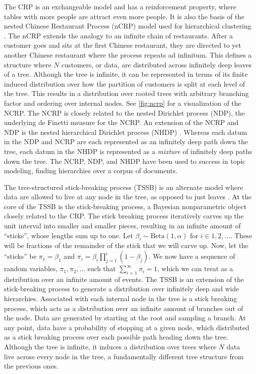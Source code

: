\documentclass{article}
\begin{document}
The CRP is an exchangeable model
and has a reinforcement property, where
tables with more people are attract 
even more people. It is
also the basis of the nested Chinese
Restaurant Process (nCRP) model
used for hierarchical clustering \citep{Blei2010}.
The nCRP extends the analogy to
an infinite chain of restaurants.
After a customer goes and sits
at the first Chinese restaurant,
they are directed to yet another
Chinese restaurant where the process
repeats ad infinitum. This defines
a structure where $N$ customers, or data,
are distributed
across infinitely deep leaves of a tree.
Although the tree is infinite,
it can be represented in terms of its
finite induced distribution over
how the partition of customers is split
at each level of the tree. 
This results in a distribution over rooted trees
with arbitrary branching factor and ordering over internal nodes.
See \autoref{fig:ncrp} for a visualization of the NCRP.
The NCRP
is closely related to the nested Dirichlet process (NDP),
the underlying de Finetti measure for the NCRP.
An extension
of the NCRP and NDP is the nested hierarchical Dirichlet
process (NHDP) \citep{Paisley2014}. Whereas each datum in the NDP and NCRP
are each represented as an infinitely deep path
down the tree, each datum in the NHDP
is represented as a \emph{mixture} of
infinitely deep paths down the tree. 
The NCRP, NDP, and NHDP have been used to success
in topic modeling, finding hierarchies over
a corpus of documents.

The tree-structured stick-breaking process (TSSB)
is an alternate model 
where data are allowed to live at any node
in the tree, as opposed to just leaves \citep{Adams2010}.
At the core of the TSSB is the
stick-breaking process, a Bayesian nonparametric object
closely related to the CRP.
The stick breaking process
iteratively carves up the unit interval
into smaller and smaller pieces,
resulting in an infinite amount of ``sticks'',
whose lengths sum up to one.
Let $\beta_i \sim \text{Beta}(1, \alpha)$ for
$i \in 1,2,\ldots$.
These will be fractions of the remainder
of the stick that we will carve up.
Now, let the ``sticks''
be $\pi_1 = \beta_1$ and $\pi_i = \beta_i \prod_{j = 1}^i (1 - \beta_j)$.
We now have a sequence of
random variables, $\pi_1, \pi_2, \ldots$
such that $\sum_{i = 1}^\infty \pi_i = 1$,
which we can treat as a distribution over
an infinite amount of events.
The TSSB is an extension of the stick-breaking process
to generate a distribution
over infinitely deep and wide hierarchies.
Associated with each internal node in the tree
is a stick breaking process,
which acts as a distribution over an infinite
amount of branches out of the node.
Data are generated by starting at the root
and sampling a branch. At any point,
data have a probability of stopping at a given node,
which distributed as a stick breaking process
over each possible path heading down the tree.
Although the tree is infinite, it induces a distribution
over trees where $N$ data live across every node
in the tree, a fundamentally different tree structure
from the previous ones.
\end{document}
